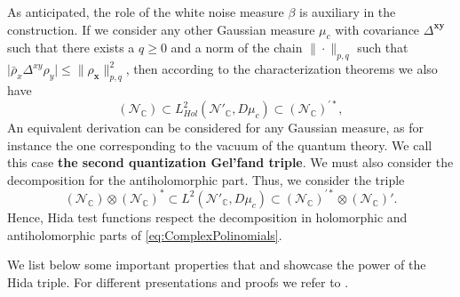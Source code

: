 \documentclass{elsarticle}%
\begin{document}
  As anticipated, the role of the white noise measure $\beta$ is auxiliary in the construction. If we consider any other Gaussian measure $\mu_c$ with covariance $\Delta^{\mathbf{xy}}$ such that there exists a $q\geq 0$ and a norm of the chain $\| \cdot \|_{p,q}$ such that $\lvert\bar\rho_x\Delta^{xy}\rho_y \rvert \leq  \| \rho_{\mathbf{x}} \|_{p,q}^2 $, then according to the characterization theorems \cite{kondratievGeneralizedFunctionals1996} we also have 
  \begin{equation}
    \label{eq:Triple_hida_second}
    (\mathcal{N}_{\mathbb{C}})\subset L^2_{Hol}(\mathcal{N}'_{\mathbb{C}}, D\mu_c)\subset (\mathcal{N}_{\mathbb{C}})^{\prime *},
    \end{equation}
An equivalent derivation can be considered for any Gaussian measure, as for instance the one corresponding to the vacuum of the quantum theory.
 We call this case \textbf{the second quantization Gel'fand triple}. We must also consider the decomposition for the antiholomorphic part. Thus, we consider the triple  
 \begin{equation}
     \label{eq:gelfandtriples}
      (\mathcal{N}_\mathbb{C})\otimes (\mathcal{N}_\mathbb{C})^* \subset L^2(\mathcal{N}'_{\mathbb{C}}, D\mu_c)\subset (\mathcal{N}_{\mathbb{C}})^{\prime \ast}\otimes (\mathcal{N}_\mathbb{C})'.
     \end{equation}
      {Hence,} Hida test functions respect the decomposition in holomorphic and antiholomorphic parts of \eqref{eq:ComplexPolinomials}.
     
 


 We list below some important properties that and  showcase the power of the Hida triple. For different presentations and proofs we refer to  \cite{kondratievGeneralizedFunctionals1996,hidaWhiteNoise1993,kuoWhiteNoise1996,obataWhiteNoise1994,westerkampRecentResults2003}.
 
\end{document}
